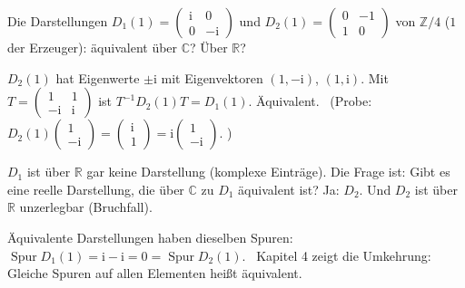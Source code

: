 \begin{aufgabe}
Die Darstellungen $D_1(1) = \begin{pmatrix}\mathrm i & 0\\ 0 & -\mathrm i\end{pmatrix}$ und $D_2(1) = \begin{pmatrix}0 & -1\\ 1 & 0\end{pmatrix}$ von $\mathbb Z/4$ ($1$ der Erzeuger): äquivalent über $\mathbb C$? Über $\mathbb R$?

\loesung
{}
$D_2(1)$ hat Eigenwerte $\pm\mathrm i$ mit Eigenvektoren $(1, -\mathrm i)$, $(1, \mathrm i)$. Mit $T = \begin{pmatrix}1 & 1\\ -\mathrm i & \mathrm i\end{pmatrix}$ ist $T^{-1}D_2(1)T = D_1(1)$. Äquivalent. \checkmark\ (Probe: $D_2(1)\begin{pmatrix}1\\ -\mathrm i\end{pmatrix} = \begin{pmatrix}\mathrm i\\ 1\end{pmatrix} = \mathrm i\begin{pmatrix}1\\ -\mathrm i\end{pmatrix}$. \checkmark)

$D_1$ ist über $\mathbb R$ gar keine Darstellung (komplexe Einträge). Die Frage ist: Gibt es eine reelle Darstellung, die über $\mathbb C$ zu $D_1$ äquivalent ist? Ja: $D_2$. Und $D_2$ ist über $\mathbb R$ unzerlegbar (Bruchfall).

Äquivalente Darstellungen haben dieselben Spuren: $\operatorname{Spur}D_1(1) = \mathrm i - \mathrm i = 0 = \operatorname{Spur}D_2(1)$. \checkmark\ Kapitel 4 zeigt die Umkehrung: Gleiche Spuren auf allen Elementen heißt äquivalent.

\begin{center}
\begin{minipage}{0.88\textwidth}
\end{minipage}
\end{center}
\end{aufgabe}

